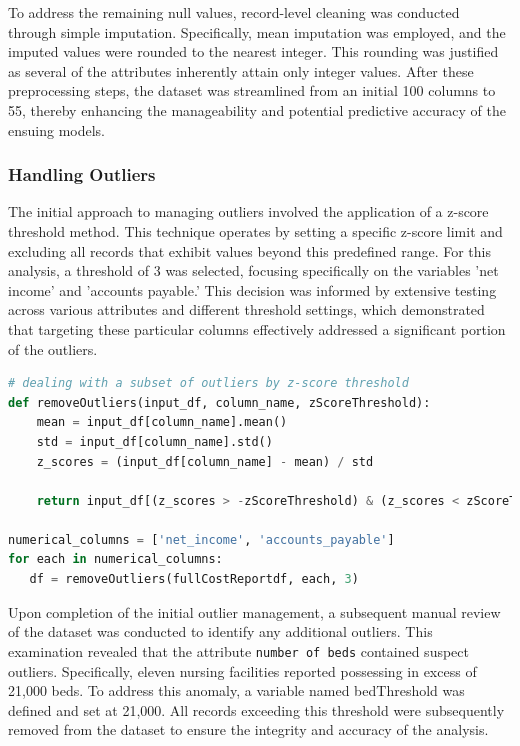 \documentclass{article}
\theoremstyle{mytheoremstyle}
\theoremstyle{mytheoremstyle}
\theoremstyle{myproblemstyle}
\begin{document}
To address the remaining null values, record-level cleaning was conducted through simple imputation. Specifically, mean imputation was employed, and the imputed values were rounded to the nearest integer. This rounding was justified as several of the attributes inherently attain only integer values. After these preprocessing steps, the dataset was streamlined from an initial 100 columns to 55, thereby enhancing the manageability and potential predictive accuracy of the ensuing models.

\subsubsection{Handling Outliers}
The initial approach to managing outliers involved the application of a z-score threshold method. This technique operates by setting a specific z-score limit and excluding all records that exhibit values beyond this predefined range. For this analysis, a threshold of 3 was selected, focusing specifically on the variables 'net income' and 'accounts payable.' This decision was informed by extensive testing across various attributes and different threshold settings, which demonstrated that targeting these particular columns effectively addressed a significant portion of the outliers.

\begin{lstlisting}[language=Python, caption=Function to clean by z-score threshold]
# dealing with a subset of outliers by z-score threshold
def removeOutliers(input_df, column_name, zScoreThreshold):
    mean = input_df[column_name].mean()
    std = input_df[column_name].std()
    z_scores = (input_df[column_name] - mean) / std

    return input_df[(z_scores > -zScoreThreshold) & (z_scores < zScoreThreshold)]

numerical_columns = ['net_income', 'accounts_payable']
for each in numerical_columns:
   df = removeOutliers(fullCostReportdf, each, 3)
\end{lstlisting}

Upon completion of the initial outlier management, a subsequent manual review of the dataset was conducted to identify any additional outliers. This examination revealed that the attribute \texttt{number of beds} contained suspect outliers. Specifically, eleven nursing facilities reported possessing in excess of 21,000 beds. To address this anomaly, a variable named bedThreshold was defined and set at 21,000. All records exceeding this threshold were subsequently removed from the dataset to ensure the integrity and accuracy of the analysis.
\end{document}

